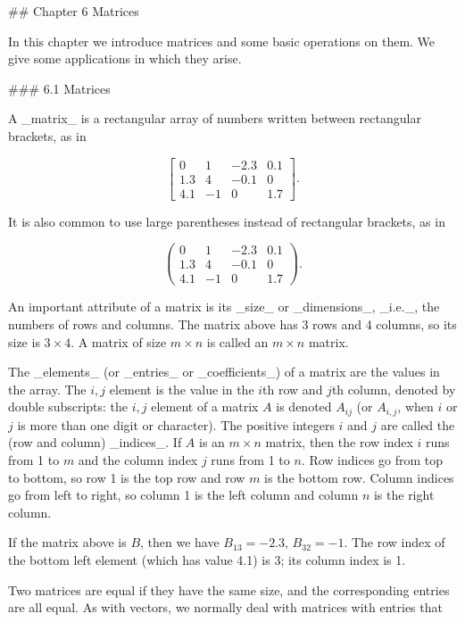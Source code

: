 

## Chapter 6 Matrices

In this chapter we introduce matrices and some basic operations on them. We give some applications in which they arise.

### 6.1 Matrices

A _matrix_ is a rectangular array of numbers written between rectangular brackets, as in

\[\left[\begin{array}{cccc}0&1&-2.3&0.1\\ 1.3&4&-0.1&0\\ 4.1&-1&0&1.7\end{array}\right].\]

It is also common to use large parentheses instead of rectangular brackets, as in

\[\left(\begin{array}{cccc}0&1&-2.3&0.1\\ 1.3&4&-0.1&0\\ 4.1&-1&0&1.7\end{array}\right).\]

An important attribute of a matrix is its _size_ or _dimensions_, _i.e._, the numbers of rows and columns. The matrix above has 3 rows and 4 columns, so its size is \(3\times 4\). A matrix of size \(m\times n\) is called an \(m\times n\) matrix.

The _elements_ (or _entries_ or _coefficients_) of a matrix are the values in the array. The \(i,j\) element is the value in the \(i\)th row and \(j\)th column, denoted by double subscripts: the \(i,j\) element of a matrix \(A\) is denoted \(A_{ij}\) (or \(A_{i,j}\), when \(i\) or \(j\) is more than one digit or character). The positive integers \(i\) and \(j\) are called the (row and column) _indices_. If \(A\) is an \(m\times n\) matrix, then the row index \(i\) runs from 1 to \(m\) and the column index \(j\) runs from 1 to \(n\). Row indices go from top to bottom, so row 1 is the top row and row \(m\) is the bottom row. Column indices go from left to right, so column 1 is the left column and column \(n\) is the right column.

If the matrix above is \(B\), then we have \(B_{13}=-2.3\), \(B_{32}=-1\). The row index of the bottom left element (which has value 4.1) is 3; its column index is 1.

Two matrices are equal if they have the same size, and the corresponding entries are all equal. As with vectors, we normally deal with matrices with entries that